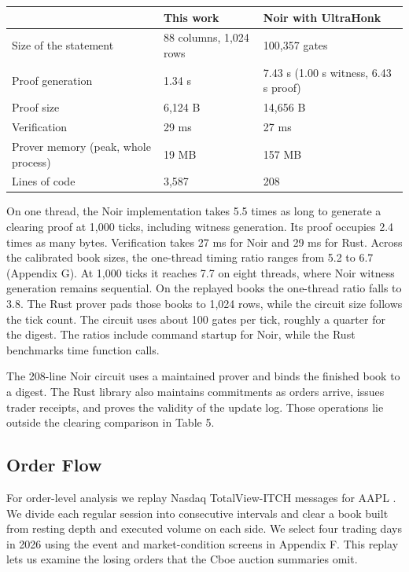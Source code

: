 \begin{longtable}[]{@{}lll@{}}
\toprule\noalign{}
& This work & Noir with UltraHonk \\
\midrule\noalign{}
\endhead
\bottomrule\noalign{}
\endlastfoot
Size of the statement & 88 columns, 1,024 rows & 100,357 gates \\
Proof generation & 1.34 s & 7.43 s (1.00 s witness, 6.43 s proof) \\
Proof size & 6,124 B & 14,656 B \\
Verification & 29 ms & 27 ms \\
Prover memory (peak, whole process) & 19 MB & 157 MB \\
Lines of code & 3,587 & 208 \\
\end{longtable}

On one thread, the Noir implementation takes 5.5 times as long to generate a clearing proof at 1,000 ticks, including witness generation. Its proof occupies 2.4 times as many bytes. Verification takes 27 ms for Noir and 29 ms for Rust. Across the calibrated book sizes, the one-thread timing ratio ranges from 5.2 to 6.7 (Appendix G). At 1,000 ticks it reaches 7.7 on eight threads, where Noir witness generation remains sequential. On the replayed books the one-thread ratio falls to 3.8. The Rust prover pads those books to 1,024 rows, while the circuit size follows the tick count. The circuit uses about 100 gates per tick, roughly a quarter for the digest. The ratios include command startup for Noir, while the Rust benchmarks time function calls.

The 208-line Noir circuit uses a maintained prover and binds the finished book to a digest. The Rust library also maintains commitments as orders arrive, issues trader receipts, and proves the validity of the update log. Those operations lie outside the clearing comparison in Table 5.

\subsection{Order Flow}

For order-level analysis we replay Nasdaq TotalView-ITCH messages for AAPL \cite{itch}. We divide each regular session into consecutive intervals and clear a book built from resting depth and executed volume on each side. We select four trading days in 2026 using the event and market-condition screens in Appendix F. This replay lets us examine the losing orders that the Cboe auction summaries omit.

